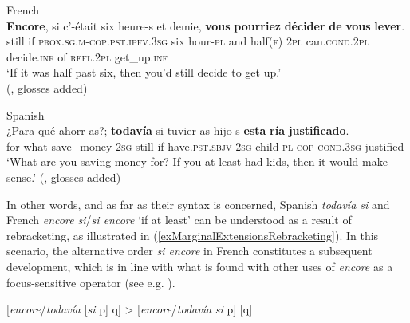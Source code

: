 \begin{exe}
\ex French\label{exMarginalExtensionsFrenchSeparation}\\
\gll \textbf{Encore}, si c'-était six heure-s et demie, \textbf{vous} \textbf{pourriez} \textbf{décider} \textbf{de} \textbf{vous} \textbf{lever}.\\
still if \textsc{prox}.\textsc{sg}.\textsc{m}-\textsc{cop}.\textsc{pst}.\textsc{ipfv}.3\textsc{sg} six hour-\textsc{pl} and half(\textsc{f}) 2\textsc{pl}
 can.\textsc{cond}.2\textsc{pl} decide.\textsc{inf} of \textsc{refl}.2\textsc{pl} get\_up.\textsc{inf}\\
\glt \lq If it was half past six, then you'd still decide to get up.'
\\(\cite[83]{VictorriFuchs1996}, glosses added)

 Spanish\\
	\gll ¿Para qué ahorr-as?; \textbf{todavía} si tuvier-as hijo-s \textbf{esta}-\textbf{ría} \textbf{justificado}.\\
	\phantom{¿}for what save\_money-2\textsc{sg} still if have.\textsc{pst}.\textsc{sbjv}-2\textsc{sg} child-\textsc{pl} \textsc{cop}-\textsc{cond}.3\textsc{sg} justified\\
	\glt \lq What are you saving money for? If you at least had kids, then it would make sense.' (\cite[s.v. \textit{todavía}]{RAEDictionary}, glosses added)
\end{exe}

In other words, and as far as their syntax is concerned, Spanish \textit{todavía si} and French \textit{encore si}/\textit{si encore} \lq if at least' can be understood as a result of rebracketing, as illustrated in (\ref{exMarginalExtensionsRebracketing}). In this scenario, the alternative order \textit{si encore} in French constitutes a subsequent development, which is in line with what is found with other uses of \textit{encore} as a focus-sensitive operator (see e.g. ).

\begin{exe}
	\ex\label{exMarginalExtensionsRebracketing}
	[\textit{encore}/\textit{todavía} [\textit{si} p] q] > [\textit{encore}/\textit{todavía} \textit{si} p] [q]
\end{exe}


